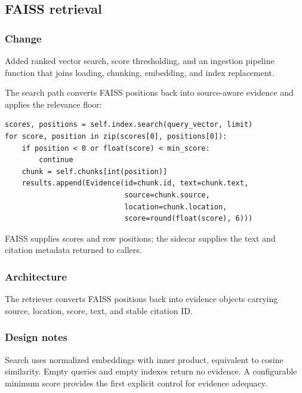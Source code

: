
\subsection{FAISS retrieval}


\subsubsection{Change}

Added ranked vector search, score thresholding, and an ingestion pipeline function that joins loading, chunking, embedding, and index replacement.

The search path converts FAISS positions back into source-aware evidence and applies the relevance floor:

\begin{verbatim}
scores, positions = self.index.search(query_vector, limit)
for score, position in zip(scores[0], positions[0]):
    if position < 0 or float(score) < min_score:
        continue
    chunk = self.chunks[int(position)]
    results.append(Evidence(id=chunk.id, text=chunk.text,
                            source=chunk.source,
                            location=chunk.location,
                            score=round(float(score), 6)))
\end{verbatim}

FAISS supplies scores and row positions; the sidecar supplies the text and citation metadata returned to callers.

\subsubsection{Architecture}

The retriever converts FAISS positions back into evidence objects carrying source, location, score, text, and stable citation ID.

\subsubsection{Design notes}

Search uses normalized embeddings with inner product, equivalent to cosine similarity. Empty queries and empty indexes return no evidence. A configurable minimum score provides the first explicit control for evidence adequacy.

